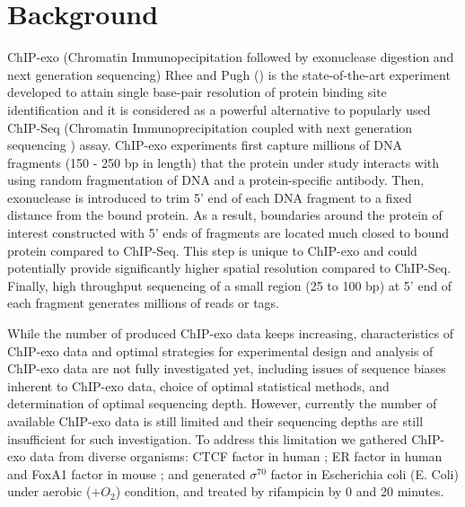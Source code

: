 \documentclass{bmcart}\usepackage[]{graphicx}\usepackage[]{color}
\begin{document}
\newpage

\listoffigures

\newpage

\section{Background}
\label{sec:intro}

ChIP-exo (Chromatin Immunopecipitation followed by exonuclease
digestion and next generation sequencing) Rhee and Pugh (\cite{exo1})
is the state-of-the-art experiment developed to attain single
base-pair resolution of protein binding site identification and it is
considered as a powerful alternative to popularly used ChIP-Seq
(Chromatin Immunoprecipitation coupled with next generation sequencing
) assay. ChIP-exo experiments first capture millions of DNA fragments
(150 - 250 bp in length) that the protein under study interacts with
using random fragmentation of DNA and a protein-specific
antibody. Then, exonuclease is introduced to trim 5' end of each DNA
fragment to a fixed distance from the bound protein. As a result,
boundaries around the protein of interest constructed with 5' ends of
fragments are located much closed to bound protein compared to
ChIP-Seq. This step is unique to ChIP-exo and could potentially
provide significantly higher spatial resolution compared to
ChIP-Seq. Finally, high throughput sequencing of a small region (25 to
100 bp) at 5' end of each fragment generates millions of reads or
tags.

While the number of produced ChIP-exo data keeps increasing,
characteristics of ChIP-exo data and optimal strategies for
experimental design and analysis of ChIP-exo data are not fully
investigated yet, including issues of sequence biases inherent to
ChIP-exo data, choice of optimal statistical methods, and
determination of optimal sequencing depth. However, currently the
number of available ChIP-exo data is still limited and their
sequencing depths are still insufficient for such investigation. To
address this limitation we gathered ChIP-exo data from diverse
organisms: CTCF factor in human \cite{exo1}; ER factor in human and
FoxA1 factor in mouse \cite{exoillumina}; and generated $\sigma^{70}$
factor in Escherichia coli (E. Coli) under aerobic ($ + O_2$)
condition, and treated by rifampicin by 0 and 20 minutes.
\end{document}
